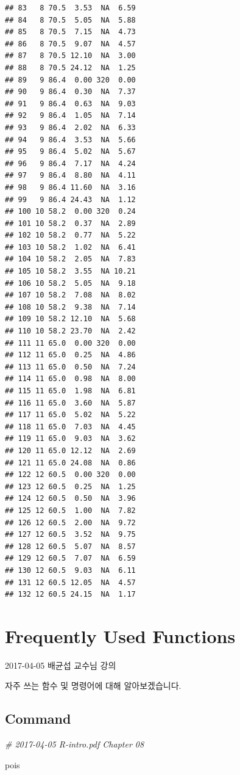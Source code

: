\documentclass[11pt,]{krantz}
\makeatletter
\newenvironment{Shaded}{\begin{snugshade}}{\end{snugshade}}
\newcommand{\CommentTok}[1]{\textcolor[rgb]{0.56,0.35,0.01}{\textit{#1}}}
\newcommand{\NormalTok}[1]{#1}
\renewenvironment{quote}{\begin{VF}}{\end{VF}}
\newenvironment{kframe}{%
\medskip{}
\setlength{\fboxsep}{.8em}
 \def\at@end@of@kframe{}%
 \ifinner\ifhmode%
  \def\at@end@of@kframe{\end{minipage}}%
  \begin{minipage}{\columnwidth}%
 \fi\fi%
 \def\FrameCommand##1{\hskip\@totalleftmargin \hskip-\fboxsep
 \colorbox{shadecolor}{##1}\hskip-\fboxsep
     \hskip-\linewidth \hskip-\@totalleftmargin \hskip\columnwidth}%
 \MakeFramed {\advance\hsize-\width
   \@totalleftmargin\z@ \linewidth\hsize
   \@setminipage}}%
 {\par\unskip\endMakeFramed%
 \at@end@of@kframe}
\renewenvironment{Shaded}{\begin{kframe}}{\end{kframe}}
\theoremstyle{definition}
\theoremstyle{definition}
\theoremstyle{remark}
\makeatother
\begin{document}
\begin{verbatim}
## 83   8 70.5  3.53  NA  6.59
## 84   8 70.5  5.05  NA  5.88
## 85   8 70.5  7.15  NA  4.73
## 86   8 70.5  9.07  NA  4.57
## 87   8 70.5 12.10  NA  3.00
## 88   8 70.5 24.12  NA  1.25
## 89   9 86.4  0.00 320  0.00
## 90   9 86.4  0.30  NA  7.37
## 91   9 86.4  0.63  NA  9.03
## 92   9 86.4  1.05  NA  7.14
## 93   9 86.4  2.02  NA  6.33
## 94   9 86.4  3.53  NA  5.66
## 95   9 86.4  5.02  NA  5.67
## 96   9 86.4  7.17  NA  4.24
## 97   9 86.4  8.80  NA  4.11
## 98   9 86.4 11.60  NA  3.16
## 99   9 86.4 24.43  NA  1.12
## 100 10 58.2  0.00 320  0.24
## 101 10 58.2  0.37  NA  2.89
## 102 10 58.2  0.77  NA  5.22
## 103 10 58.2  1.02  NA  6.41
## 104 10 58.2  2.05  NA  7.83
## 105 10 58.2  3.55  NA 10.21
## 106 10 58.2  5.05  NA  9.18
## 107 10 58.2  7.08  NA  8.02
## 108 10 58.2  9.38  NA  7.14
## 109 10 58.2 12.10  NA  5.68
## 110 10 58.2 23.70  NA  2.42
## 111 11 65.0  0.00 320  0.00
## 112 11 65.0  0.25  NA  4.86
## 113 11 65.0  0.50  NA  7.24
## 114 11 65.0  0.98  NA  8.00
## 115 11 65.0  1.98  NA  6.81
## 116 11 65.0  3.60  NA  5.87
## 117 11 65.0  5.02  NA  5.22
## 118 11 65.0  7.03  NA  4.45
## 119 11 65.0  9.03  NA  3.62
## 120 11 65.0 12.12  NA  2.69
## 121 11 65.0 24.08  NA  0.86
## 122 12 60.5  0.00 320  0.00
## 123 12 60.5  0.25  NA  1.25
## 124 12 60.5  0.50  NA  3.96
## 125 12 60.5  1.00  NA  7.82
## 126 12 60.5  2.00  NA  9.72
## 127 12 60.5  3.52  NA  9.75
## 128 12 60.5  5.07  NA  8.57
## 129 12 60.5  7.07  NA  6.59
## 130 12 60.5  9.03  NA  6.11
## 131 12 60.5 12.05  NA  4.57
## 132 12 60.5 24.15  NA  1.17
\end{verbatim}

\chapter{Frequently Used Functions}\label{frequently-used-functions}

\begin{quote}
2017-04-05 배균섭 교수님 강의
\end{quote}

자주 쓰는 함수 및 명령어에 대해 알아보겠습니다.

\section{Command}\label{command}

\begin{Shaded}
\begin{Highlighting}[]
\CommentTok{# 2017-04-05 R-intro.pdf Chapter 08}

\NormalTok{pois}
\end{Highlighting}
\end{Shaded}
\end{document}
